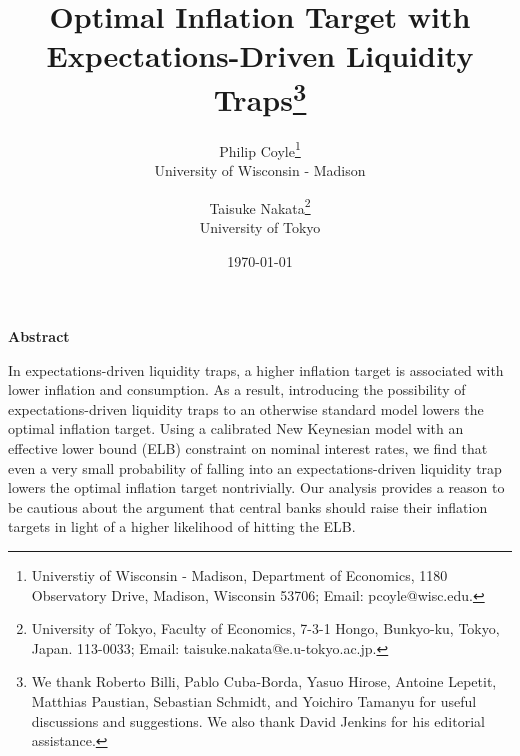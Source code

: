 \documentclass[11pt]{article}
\begin{document}
	
	\title{Optimal Inflation Target with\\Expectations-Driven Liquidity Traps\footnote{We thank Roberto Billi, Pablo Cuba-Borda, Yasuo Hirose, Antoine Lepetit, Matthias Paustian, Sebastian Schmidt, and Yoichiro Tamanyu for useful discussions and suggestions. We also thank David Jenkins for his editorial assistance.}}
	\author{
		Philip Coyle\thanks{Universtiy of Wisconsin - Madison,  Department of Economics, 1180 Observatory Drive, Madison, Wisconsin 53706; Email: pcoyle@wisc.edu.}\\
		University of Wisconsin - Madison
		\and 
		Taisuke Nakata\thanks{University of Tokyo, Faculty of Economics, 7-3-1 Hongo, Bunkyo-ku, Tokyo, Japan. 113-0033; Email: taisuke.nakata@e.u-tokyo.ac.jp.}\\
		University of Tokyo
	}
	\date{\mydate\today}
	
	\maketitle
	
	\vspace{-0.3in}
	
	\begin{center}
		\textbf{Abstract}
	\end{center}
	\noindent In expectations-driven liquidity traps, a higher inflation target is associated with lower inflation and consumption. As a result, introducing the possibility of expectations-driven liquidity traps to an otherwise standard model lowers the optimal inflation target. Using a calibrated New Keynesian model with an effective lower bound (ELB) constraint on nominal interest rates, we find that even a very small probability of falling into an expectations-driven liquidity trap lowers the optimal inflation target nontrivially. Our analysis provides a reason to be cautious about the argument that central banks should raise their inflation targets in light of a higher likelihood of hitting the ELB.
	
\end{document}
